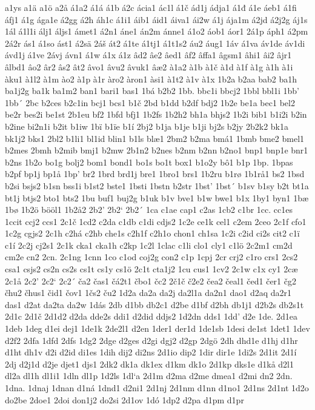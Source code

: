 a1ys
a1ä
a1ö
a2å
á1a2
á1á
á1b
á2c
ácia1
ác1l
á1č
ád1j
ádja1
á1đ
á1e
áeb1
á1fi
áfj1
á1g
ága1e
á2gg
á2h
áh1c
á1i1
áib1
áid1
áiva1
ái2w
á1j
ája1m
á2jd
á2j2g
áj1s
1ál
á1l1i
álj1
áljs1
ámet1
á2n1
áne1
án2m
ánne1
á1o2
áob1
áor1
2á1p
áph1
á2pm
2á2r
ás1
á1so
ást1
á2sä
2áš
át2
á1te
á1tj1
á1t1s2
áu2
áug1
1áv
á1va
áv1de
áv1di
ávd1j
á1ve
2ávj
ávn1
á1w
á1x
á1z
âd2
âe2
âed1
âf2
âffa1
âgsm1
âhi1
âi2
âjr1
âlbd1
âo2
âr2
âs2
ât2
âvo1
âvu2
âvuk1
âæ2
à1a2
à1b
à1č
à1d
à1f
à1g
à1h
à1i
àku1
à1l2
à1m
ào2
à1p
à1r
àro2
àron1
àsi1
à1t2
à1v
à1x
1b2a
b2aa
bab2
ba1h
ba1j2g
ba1k
ba1m2
ban1
bari1
bas1
1bá
b2b2
1bb.
bbc1i
bbcj2
1bbl
bbl1i
1bb'
1bb´
2bc
b2ces
b2c1in
bcj1
bcs1
b1č
2bd
b1dd
b2df
bdj2
1b2e
be1a
bec1
bel2
be2r
bes2i
be1st
2b1eu
bf2
1bfd
bfj1
1b2fs
1b2h2
bh1a
bhjs2
1b2i
bib1
b1i2i
b2in
b2ine
bi2n1i
b2it
b1iw
1bï
b1ïe
b1í
2bj2
b1ja
b1je
b1ji
bj2s
b2jy
2b2k2
bk1a
bk1j2
bks1
2bl2
b1li1
bl1id
blin1
b1ls
blæ1
2bm2
b2ma
bmá1
1bmb
bme2
bmel1
b2mes
2bmh
b2mib
bmj1
b2mw
2b1n2
b2nes
b2nm
b2nn
b2no1
bnp1
bnp1e
bnr1
b2ns
1b2o
bo1g
bolj2
bom1
bond1
bo1s
bo1t
box1
b1o2y
bô1
b1p
1bp.
1bpas
b2pf
bp1j
bp1å
1bp'
br2
1brd
brd1j
bre1
1bro1
brs1
1b2ru
b1rø
1b1rå1
bs2
1bsd
b2si
bsjs2
b1sn
bss1i
b1st2
bste1
1bsti
1bstn
b2str
1bst'
1bst´
b1sv
b1sy
b2t
bt1a
bt1j
btjs2
bto1
bts2
1bu
buf1
buj2g
b1uk
b1v
bve1
b1w
bwe1
b1x
1by1
byn1
1bæ
1bø
1b2ö
bööl1
1b2å2
2b2'
2b2`
2b2´
1ca
c1ae
cap1
c2as
1cb2
c1br
1cc.
cc1es
1ccit
ccj2
ccs1
2c1č
1cd2
c2da
c1db
c1di
cdjs2
1c2e
ce1k
cel1
c2em
2ceo
2c1f
cfo1
1c2g
cgjs2
2c1h
c2há
c2hb
che1s
c2h1f
c2h1o
chon1
ch1sa
1c2i
c2id
ci2s
cit2
c1ï
c1í
2c2j
cj2s1
2c1k
cka1
cka1h
c2kp
1c2l
1clac
c1li
clo1
cly1
c1lö
2c2m1
cm2d
cm2e
cn2
2cn.
2c1ng
1cnn
1co
c1od
coj2g
con2
c1p
1cpj
2cr
crj2
c1ro
crs1
2cs2
csa1
csjs2
cs2n
cs2s
cs1t
cs1y
cs1ö
2c1t
cta1j2
1cu
cus1
1cv2
2c1w
c1x
cy1
2cæ
2c1å
2c2'
2c2`
2c2´
ča2
čas1
čá2t1
čbo1
čc2
2č1č
č2e2
čea2
čeal1
čed1
čer1
čg2
čhu2
čhus1
čid1
čov1
1čs2
ču2
1d2a
da2a
da2j
da2l1a
da2n1
dao1
d2aq
da2r1
das1
d2at
da2ta
da2w
1dás
2db
d1bb
db2c1
d2be
d1bf
d2bh
db1j1
d2b2s
db2s1t
2d1c
2d1č
2d1d2
d2da
dde2s
ddi1
d2did
ddjs2
1d2dn
dds1
1dd'
d2e
1de.
2d1ea
1deb
1deg
d1ei
dej1
1de1k
2de2l1
d2en
1der1
der1d
1de1sb
1desi
de1st
1det1
1dev
d2f2
2dfa
1dfd
2dfs
1dg2
2dge
d2ges
d2gi
dgj2
d2gp
2dgö
2dh
dhd1e
d1hj
d1hr
d1ht
dh1v
d2i
d2id
di1es
1dih
dij2
di2ns
2d1io
dip2
1dir
dir1e
1di2s
2d1it
2d1í
2dj
d2j1d
d2je
djet1
djs1
2dk2
dk1a
dk1ex
d1km
dk1o
2d1kp
dks1e
d1kå
d2l1
dl2a
dl1h
dl1i1
1dln
dl1p
1d2ls
1dl`a
2d1m
d2ma
d2me
dmea1
d2mi
dn2
2dn.
1dna.
1dnaj
1dnan
d1ná
1dnd1
d2ni1
2d1nj
2d1nm
d1nn
d1no1
2d1ns
2d1nt
1d2o
do2be
2doe1
2doi
don1j2
do2si
2d1ov
1dó
1dp2
d2pa
d1pm
d1pr
